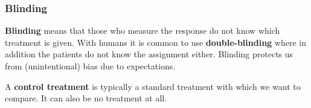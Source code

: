 \subsubsection{Blinding}

\textbf{Blinding} means that those who measure the response do not know which treatment is given. With humans it is common to use \textbf{double-blinding} where in addition the patients do not know the assignment either. Blinding protects us from (unintentional) bias due to expectations.\medskip

A \textbf{control treatment} is typically a standard treatment with which we want to compare. It can also be no treatment at all.